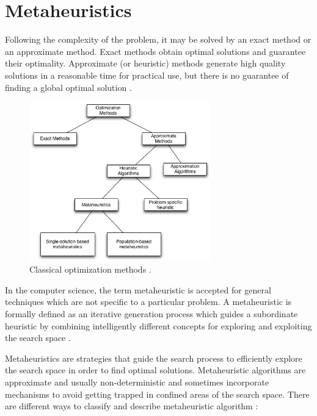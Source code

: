\chapter{Metaheuristics}


Following the complexity of the problem, it may be solved by an exact method or an
approximate method. Exact methods obtain optimal solutions and guarantee
their optimality. Approximate (or heuristic) methods generate high quality
solutions in a reasonable time for practical use, but there is no guarantee of finding a global optimal solution \cite{Talbi2013}.


\begin{figure}[h]
\centering
\includegraphics[width=0.7\textwidth]{./images/optimization.png}
\caption{Classical optimization methods \cite{Talbi2013}. }
\label{fig:optimization}
\end{figure}


In the computer science, the term metaheuristic is accepted for general techniques which are not specific to a particular problem. A metaheuristic is formally defined as an iterative generation process which guides a subordinate heuristic by combining intelligently different concepts for exploring and exploiting the search space \cite{raidl2010metaheuristic}. 

Metaheuristics are strategies that guide the search process to efficiently explore the search space in order to find optimal solutions. Metaheuristic algorithms are approximate and usually non-deterministic and sometimes incorporate mechanisms to avoid getting trapped in confined areas of the search space. There are different ways to classify and describe metaheuristic algorithm \cite{Blum2003}:


